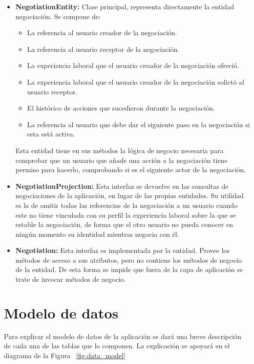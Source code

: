 \documentclass[a4paper, 12pt]{book}
\begin{document}
	\begin{itemize}
	\item \textbf{NegotiationEntity:} Clase principal, representa directamente la entidad negociación. 
	Se compone de:
		\begin{itemize}
		\item La referencia al usuario creador de la negociación.
		\item La referencia al usuario receptor de la negociación.
		\item La experiencia laboral que el usuario creador de la negociación ofreció.
		\item La experiencia laboral que el usuario creador de la negociación solictó al usuario receptor.
		\item El histórico de acciones que sucedieron durante la negociación.
		\item La referencia al usuario que debe dar el siguiente paso en la negociación si esta está activa.
		\end{itemize}
	Esta entidad tiene en sus métodos la lógica de negocio necesaria para comprobar que un usuario que añade una acción a la negociación tiene permiso para hacerlo, comprobando si es el siguiente actor de la negociación.
	\item \textbf{NegotiationProjection:} Esta interfaz se devuelve en las consultas de negociaciones de la aplicación, en lugar de las propias entidades.
	 Su utilidad es la de omitir todas las referencias de la negociación a un usuario cuando este no tiene vinculada con su perfil la experiencia laboral sobre la que se estable la negociación, de forma que el otro usuario no pueda conocer en ningún momento su identidad mientras negocia con él.	
	\item \textbf{Negotiation:} Esta interfaz es implementada por la entidad. Provee los métodos de acceso a sus atributos, pero no contiene los métodos de negocio de la entidad. De esta forma se impide que fuera de la capa de aplicación se trate de invocar métodos de negocio.
	\end{itemize}



\section{Modelo de datos} 
\label{sec:data_model}
Para explicar el modelo de datos de la aplicación se dará una breve descripción de cada una de las tablas que lo componen. La explicación se apoyará en el diagrama de la Figura ~\ref{fig:data_model}
\end{document}
